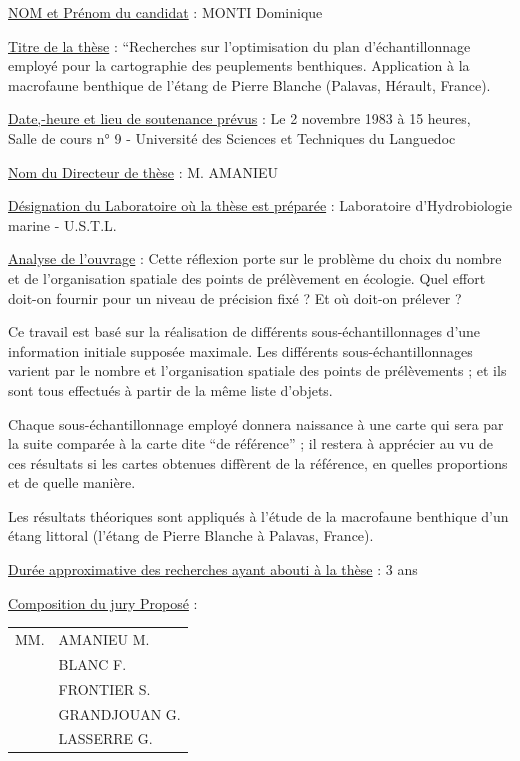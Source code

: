 \uline{NOM et Prénom du candidat} : MONTI Dominique

\uline{Titre de la thèse} : ``Recherches sur l'optimisation du plan d'échantillonnage employé pour la cartographie des peuplements benthiques. Application à la macrofaune benthique de l'étang de Pierre Blanche (Palavas, Hérault, France).

\uline{Date,-heure et lieu de soutenance prévus} : Le 2 novembre 1983 à 15 heures,\\
Salle de cours n° 9 - Université des Sciences et Techniques du Languedoc

\uline{Nom du Directeur de thèse} : M. AMANIEU

\uline{Désignation du Laboratoire où la thèse est préparée} : Laboratoire d'Hydrobiologie marine - U.S.T.L.

\uline{Analyse de l'ouvrage} : Cette réflexion porte sur le problème du choix du nombre et de l'organisation spatiale des points de prélèvement en écologie. Quel effort doit-on fournir pour un niveau de précision fixé ? Et où doit-on prélever ?

Ce travail est basé sur la réalisation de différents sous-échantillonnages d'une information initiale supposée maximale. Les différents sous-échantillonnages varient par le nombre et l'organisation spatiale des points de prélèvements ; et ils sont tous effectués à partir de la même liste d'objets.

Chaque sous-échantillonnage employé donnera naissance à une carte qui sera par la suite comparée à la carte dite ``de référence'' ; il restera à apprécier au vu de ces résultats si les cartes obtenues diffèrent de la référence, en quelles proportions et de quelle manière.

Les résultats théoriques sont appliqués à l'étude de la macrofaune benthique d'un étang littoral (l'étang de Pierre Blanche à Palavas, France).

\uline{Durée approximative des recherches ayant abouti à la thèse} : 3 ans

\uline{Composition du jury Proposé} : \begin{tabular}[t]{ll}
MM. & AMANIEU M.\\
& BLANC F.\\
& FRONTIER S.\\
& GRANDJOUAN G.\\
& LASSERRE G.
\end{tabular}

